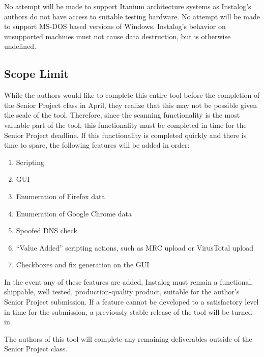 No attempt will be made to support Itanium architecture systems as Instalog's
authors do not have access to suitable testing hardware. No attempt will be made
to support MS-DOS based versions of Windows. Instalog's behavior on unsupported
machines must not cause data destruction, but is otherwise undefined.

\subsection{Scope Limit}
While the authors would like to complete this entire tool before the completion
of the Senior Project class in April, they realize that this may not be possible
given the scale of the tool. Therefore, since the scanning functionality is the
most valuable part of the tool, this functionality must be completed in time for
the Senior Project deadline.  If this functionality is completed quickly and
there is time to spare, the following features will be added in order:
\begin{enumerate}
    \item Scripting 
    \item GUI 
    \item Enumeration of Firefox data
    \item Enumeration of Google Chrome data
    \item Spoofed DNS check
    \item ``Value Added'' scripting actions, such as MRC upload or VirusTotal
    upload
    \item Checkboxes and fix generation on the GUI
\end{enumerate}

In the event any of these features are added, Instalog must remain a
functional, shippable, well tested, production-quality product, suitable for the
author's Senior Project submission.  If a feature cannot be developed to a
satisfactory level in time for the submission, a previously stable release of
the tool will be turned in.

The authors of this tool will complete any remaining deliverables outside of
the Senior Project class.